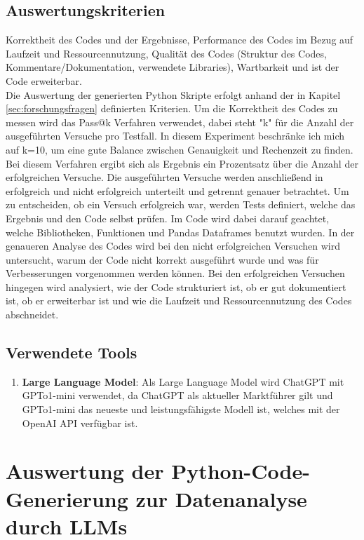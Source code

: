 \documentclass[11pt,a4paper]{article}
\begin{document}
\subsection{Auswertungskriterien}
\label{sec:auswertungskriterien}
    Korrektheit des Codes und der Ergebnisse, Performance des Codes im Bezug auf Laufzeit und Ressourcennutzung, Qualität des Codes (Struktur des Codes, Kommentare/Dokumentation, verwendete Libraries), Wartbarkeit und ist der Code erweiterbar.\\

    Die Auswertung der generierten Python Skripte erfolgt anhand der in Kapitel \ref{sec:forschungsfragen} definierten Kriterien. Um die Korrektheit des Codes zu messen wird das Pass@k Verfahren verwendet, dabei steht "k" für die Anzahl der ausgeführten Versuche pro Testfall. In diesem Experiment beschränke ich mich auf k=10, um eine gute Balance zwischen Genauigkeit und Rechenzeit zu finden. Bei diesem Verfahren ergibt sich als Ergebnis ein Prozentsatz über die Anzahl der erfolgreichen Versuche. Die ausgeführten Versuche werden anschließend in erfolgreich und nicht erfolgreich unterteilt und getrennt genauer betrachtet. Um zu entscheiden, ob ein Versuch erfolgreich war, werden Tests definiert, welche das Ergebnis und den Code selbst prüfen. Im Code wird dabei darauf geachtet, welche Bibliotheken, Funktionen und Pandas Dataframes benutzt wurden.
    In der genaueren Analyse des Codes wird bei den nicht erfolgreichen Versuchen wird untersucht, warum der Code nicht korrekt ausgeführt wurde und was für Verbesserungen vorgenommen werden können. Bei den erfolgreichen Versuchen hingegen wird analysiert, wie der Code strukturiert ist, ob er gut dokumentiert ist, ob er erweiterbar ist und wie die Laufzeit und Ressourcennutzung des Codes abschneidet.

\subsection{Verwendete Tools}
    \begin{enumerate}
        \item \textbf{Large Language Model}: Als Large Language Model wird ChatGPT mit GPTo1-mini verwendet, da ChatGPT als aktueller Marktführer gilt und GPTo1-mini das neueste und leistungsfähigste Modell ist, welches mit der OpenAI API verfügbar ist.
        
    \end{enumerate}

\section{Auswertung der Python-Code-Generierung zur Datenanalyse durch LLMs}
\label{sec:auswertung }
\end{document}
